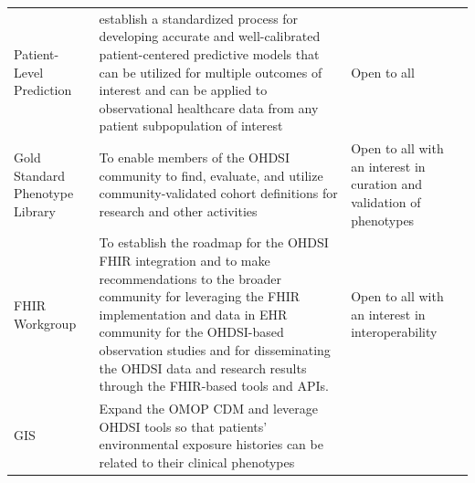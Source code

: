 \documentclass[11pt]{book}
\theoremstyle{definition}
\theoremstyle{definition}
\theoremstyle{definition}
\theoremstyle{remark}
\begin{document}
\begin{longtable}[]{@{}lll@{}}
\begin{minipage}[t]{0.13\columnwidth}
Patient-Level Prediction\strut
\end{minipage} & \begin{minipage}[t]{0.51\columnwidth}\raggedright
establish a standardized process for developing accurate and well-calibrated patient-centered predictive models that can be utilized for multiple outcomes of interest and can be applied to observational healthcare data from any patient subpopulation of interest\strut
\end{minipage} & \begin{minipage}[t]{0.27\columnwidth}\raggedright
Open to all\strut
\end{minipage}\tabularnewline
\begin{minipage}[t]{0.13\columnwidth}\raggedright
Gold Standard Phenotype Library\strut
\end{minipage} & \begin{minipage}[t]{0.51\columnwidth}\raggedright
To enable members of the OHDSI community to find, evaluate, and utilize community-validated cohort definitions for research and other activities\strut
\end{minipage} & \begin{minipage}[t]{0.27\columnwidth}\raggedright
Open to all with an interest in curation and validation of phenotypes\strut
\end{minipage}\tabularnewline
\begin{minipage}[t]{0.13\columnwidth}\raggedright
FHIR Workgroup\strut
\end{minipage} & \begin{minipage}[t]{0.51\columnwidth}\raggedright
To establish the roadmap for the OHDSI FHIR integration and to make recommendations to the broader community for leveraging the FHIR implementation and data in EHR community for the OHDSI-based observation studies and for disseminating the OHDSI data and research results through the FHIR-based tools and APIs.\strut
\end{minipage} & \begin{minipage}[t]{0.27\columnwidth}\raggedright
Open to all with an interest in interoperability\strut
\end{minipage}\tabularnewline
\begin{minipage}[t]{0.13\columnwidth}\raggedright
GIS\strut
\end{minipage} & \begin{minipage}[t]{0.51\columnwidth}\raggedright
Expand the OMOP CDM and leverage OHDSI tools so that patients' environmental exposure histories can be related to their clinical phenotypes\strut

\end{minipage}
\end{longtable}
\end{document}
